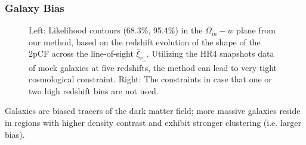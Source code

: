 \documentclass[iop]{emulateapj}
\begin{document}
\subsubsection{Galaxy Bias}


\begin{figure}
   \caption{\label{fig_contours}
   Left: Likelihood contours (68.3\%, 95.4\%) in the $\Omega_m-w$ plane from our method, 
   based on the redshift evolution of the shape of the 2pCF across the line-of-sight  $\hat\xi_{r_\perp}$.
   Utilizing the HR4 snapshots data of mock galaxies at five redshifts,
   the method can lead to very tight cosmological constraint.
   Right: The constraints in case that one or two high redshift bins are not used. 
   }
\end{figure}

Galaxies are biased tracers of the dark matter field;
more massive galaxies reside in regions with higher density contrast
and exhibit stronger clustering (i.e. larger bias).
\end{document}
